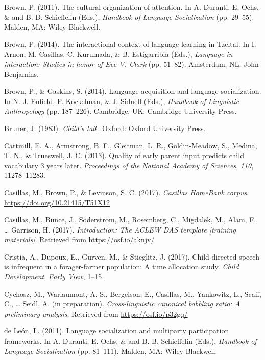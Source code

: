 \documentclass[,man,floatsintext]{apa6}
\begin{document}
\hypertarget{ref-brown2011cultural}{}
Brown, P. (2011). The cultural organization of attention. In A. Duranti,
E. Ochs, \& and B. B. Schieffelin (Eds.), \emph{Handbook of Language
Socialization} (pp. 29--55). Malden, MA: Wiley-Blackwell.

\hypertarget{ref-brown2014interactional}{}
Brown, P. (2014). The interactional context of language learning in
Tzeltal. In I. Arnon, M. Casillas, C. Kurumada, \& B. Estigarribia
(Eds.), \emph{Language in interaction: Studies in honor of Eve V. Clark}
(pp. 51--82). Amsterdam, NL: John Benjamins.

\hypertarget{ref-brown2014language}{}
Brown, P., \& Gaskins, S. (2014). Language acquisition and language
socialization. In N. J. Enfield, P. Kockelman, \& J. Sidnell (Eds.),
\emph{Handbook of Linguistic Anthropology} (pp. 187--226). Cambridge,
UK: Cambridge University Press.

\hypertarget{ref-bruner1983childs}{}
Bruner, J. (1983). \emph{Child's talk}. Oxford: Oxford University Press.

\hypertarget{ref-cartmill2013quality}{}
Cartmill, E. A., Armstrong, B. F., Gleitman, L. R., Goldin-Meadow, S.,
Medina, T. N., \& Trueswell, J. C. (2013). Quality of early parent input
predicts child vocabulary 3 years later. \emph{Proceedings of the
National Academy of Sciences}, \emph{110}, 11278--11283.

\hypertarget{ref-Casillas-HB}{}
Casillas, M., Brown, P., \& Levinson, S. C. (2017). \emph{Casillas
HomeBank corpus}. \url{https://doi.org/10.21415/T51X12}

\hypertarget{ref-casillas2017ACLEWDAS}{}
Casillas, M., Bunce, J., Soderstrom, M., Rosemberg, C., Migdalek, M.,
Alam, F., \ldots{} Garrison, H. (2017). \emph{Introduction: The ACLEW
DAS template {[}training materials{]}}. Retrieved from
\url{https://osf.io/aknjv/}

\hypertarget{ref-cristia2017child}{}
Cristia, A., Dupoux, E., Gurven, M., \& Stieglitz, J. (2017).
Child-directed speech is infrequent in a forager-farmer population: A
time allocation study. \emph{Child Development}, \emph{Early View},
1--15.

\hypertarget{ref-cychoszIPchivocOSF}{}
Cychosz, M., Warlaumont, A. S., Bergelson, E., Casillas, M., Yankowitz,
L., Scaff, C., \ldots{} Seidl, A. (in preparation).
\emph{Cross-linguistic canonical babbling ratio: A preliminary
analysis}. Retrieved from \url{https://osf.io/p32gq/}

\hypertarget{ref-deleon2011language}{}
de León, L. (2011). Language socialization and multiparty participation
frameworks. In A. Duranti, E. Ochs, \& and B. B. Schieffelin (Eds.),
\emph{Handbook of Language Socialization} (pp. 81--111). Malden, MA:
Wiley-Blackwell.
\end{document}
